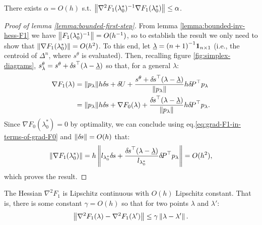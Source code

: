 \documentclass[smallcondensed]{svjour3}
\begin{document}
\begin{lemma}\label{lemma:bounded-first-step}
  There exists $\alpha = O(h)$ s.t.
  $\left\|\nabla^2 F_1(\lambda_{0}^*)^{-1} \nabla F_1(\lambda_{0}^*)\right\|
  \leq \alpha$.
\end{lemma}

\begin{proof}[Proof of lemma \ref{lemma:bounded-first-step}]
  From lemma \ref{lemma:bounded-inv-hess-F1} we have
  $\left\|F_1(\lambda_0^*)^{-1}\right\| = O(h^{-1})$, so to establish the
  result we only need to show that
  $\left\|\nabla F_1(\lambda_0^*)\right\| = O(h^2)$. To this end, let
  $\underline{\lambda} = {(n + 1)}^{-1} \boldsymbol{1}_{n \times 1}$ (i.e., the
  centroid of $\Delta^n$, where $s^\theta$ is evaluated). Then,
  recalling figure \ref{fig:simplex-diagrams},
  $s^\theta_\lambda = s^\theta + {\delta \hspace{-0.1em} s}^\top (\lambda -
  \underline{\lambda})$ so that, for a general $\lambda$:
  \begin{equation}\label{eq:grad-F1-in-terms-of-grad-F0}
    \begin{aligned}
      \nabla F_1(\lambda) &= \|p_\lambda\| h {\delta \hspace{-0.1em} s} + {\delta \hspace{-0.09em} U} + \frac{s^\theta + {\delta \hspace{-0.1em} s}^\top (\lambda - \underline{\lambda})}{\|p_\lambda\|} h {\delta \hspace{-0.14em} P}^\top p_\lambda \\
      &= \|p_\lambda\| h {\delta \hspace{-0.1em} s} + \nabla F_0(\lambda) + \frac{{\delta \hspace{-0.1em} s}^\top {(\lambda - \underline{\lambda})}}{\|p_\lambda\|} h {\delta \hspace{-0.14em} P}^\top p_\lambda.
    \end{aligned}
  \end{equation}
  Since $\nabla F_0(\lambda_0^*) = 0$ by optimality, we can conclude
  using eq.\@ \ref{eq:grad-F1-in-terms-of-grad-F0} and
  $\left\|{\delta \hspace{-0.1em} s}\right\| = O(h)$ that:
  \begin{equation}
    \left\|\nabla F_1(\lambda_0^*)\right\| = h \left\|l_{\lambda_0^*} {\delta \hspace{-0.1em} s} + \frac{{\delta \hspace{-0.1em} s}^\top {(\lambda - \underline{\lambda})}}{l_{\lambda_0^*}} {\delta \hspace{-0.14em} P}^\top p_\lambda\right\| = O(h^2),
  \end{equation}
  which proves the result.
\end{proof}

\begin{lemma}\label{lemma:hess-F1-lipschitz}
  The Hessian $\nabla^2 F_1$ is Lipschitz continuous with $O(h)$
  Lipschitz constant. That is, there is some constant $\gamma = O(h)$
  so that for two points $\lambda$ and $\lambda'$:
  \begin{align*}
    \left\|\nabla^2 F_1(\lambda) - \nabla^2 F_1(\lambda')\right\| \leq \gamma \left\|\lambda - \lambda'\right\|.
  \end{align*}
\end{lemma}
\end{document}
